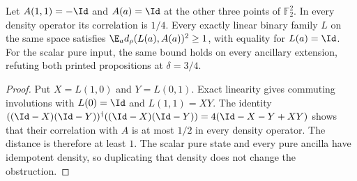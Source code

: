 \begin{lemma}
	\label{lem:linearity-four-point-obstruction}
	\leanok
	Let $A(1,1)=-\Id$ and $A(a)=\Id$ at the other three points of
	$\mathbb F_2^2$. In every density operator its correlation is $1/4$.
	Every exactly linear binary family $L$ on the same space satisfies
	$\E_a d_\rho(L(a),A(a))^2\geq1$, with equality for $L(a)=\Id$.
	For the scalar pure input, the same bound holds on every ancillary
	extension, refuting both printed propositions at $\delta=3/4$.
\end{lemma}
\begin{proof}
	\leanok
	Put $X=L(1,0)$ and $Y=L(0,1)$. Exact linearity gives commuting
	involutions with $L(0)=\Id$ and $L(1,1)=XY$. The identity
	$((\Id-X)(\Id-Y))^\dagger((\Id-X)(\Id-Y))=4(\Id-X-Y+XY)$
	shows that their correlation with $A$ is at most $1/2$ in every density
	operator. The distance is therefore at least $1$. The scalar pure state
	and every pure ancilla have idempotent density, so duplicating that
	density does not change the obstruction.
\end{proof}

